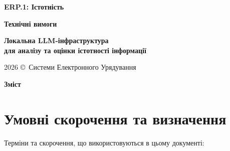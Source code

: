 \documentclass{article}
\newcommand\HUGE[1]{\fontsize{38}{38}\selectfont #1}
\begin{document}
\pagestyle{fancy}

\begin{titlepage}
\AddToShipoutPictureBG*{\AtPageLowerLeft{\color{primary}\rule{\paperwidth}{\paperheight}}}
\color{white}\thispagestyle{empty}\vspace*{4cm}\centering
  {\Huge \textbf{ERP.1: Істотність} \par} \vspace{2cm}
  {\HUGE \textbf{Технічні вимоги} \par} \vspace{2.5cm}
  {\LARGE \textbf{Локальна LLM-інфраструктура \\ для аналізу та оцінки істотності інформації} \par} \vspace{2.5cm}
\vfill
  {\large 2026 \copyright\ Системи Електронного Урядування \par}
\end{titlepage}

\newpage
\begin{center}
  {\Huge\color{primary}\bfseries Зміст\par}
\end{center}
\vspace{40pt}
\tableofcontents

\newpage
\begin{abstract}
У цьому документі наведено детальні технічні вимоги до підсистеми ERP.1: Істотність, яка розробляється
як сучасний інтелектуальний сервіс локального аналізу, семантичного пошуку та оцінки інформації на базі
штучного інтелекту (ШІ). Платформа передбачає використання децентралізованих обчислювальних вузлів з
споживчими графічними прискорювачами (GPU) для локального виконання квантованих великих мовних
моделей (LLM) та семантичного RAG-пошуку. Вимоги визначають архітектуру апаратного забезпечення,
програмний стек, вимоги безпеки (КСЗІ, LUKS, апаратний модуль безпеки, Cilium), комплаєнс із стандартами
NIST SP 800-53 та NIST AI 600-1, а також метрики оцінки якості та відмовостійкості системи в периферійному контурі.
\end{abstract}

\newpage
\section{Умовні скорочення та визначення}

Терміни та скорочення, що використовуються в цьому документі:
\end{document}
